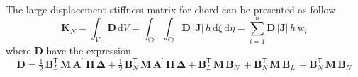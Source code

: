 The large displacement stiffness matrix for chord can be presented as follow
\begin{equation}
\mathbf{K}_{N} =  \int_{V} \mathbf{D} \, \mathrm{d} V 
= \int_{\pentagon} \int_{\pentagon} \mathbf{D} \, |\mathbf{J}|\, h \, \mathrm{d} \xi \, \mathrm{d} \eta 
= \sum_{i=1}^{n}  \mathbf{D} \, |\mathbf{J}| \, h \, \mathrm{w}_i
\end{equation}
where $\mathbf{D}$ have the expression 
\begin{equation}
\mathbf{D} = \tfrac{1}{2} \, \mathbf{B}_L^{\mathsf{T}} \, \mathbf{M} \, \mathbf{A}^{'} \, \mathbf{H} \, \boldsymbol{\Delta} + \tfrac{1}{2} \, \mathbf{B}_N^{\mathsf{T}} \, \mathbf{M} \, \mathbf{A}^{'} \, \mathbf{H} \, \boldsymbol{\Delta} + \mathbf{B}_L^{\mathsf{T}} \, \mathbf{M} \, \mathbf{B}_N \, + \mathbf{B}_N^{\mathsf{T}} \, \mathbf{M} \, \mathbf{B}_L \, + \mathbf{B}_N^{\mathsf{T}} \, \mathbf{M} \, \mathbf{B}_N
\end{equation}


